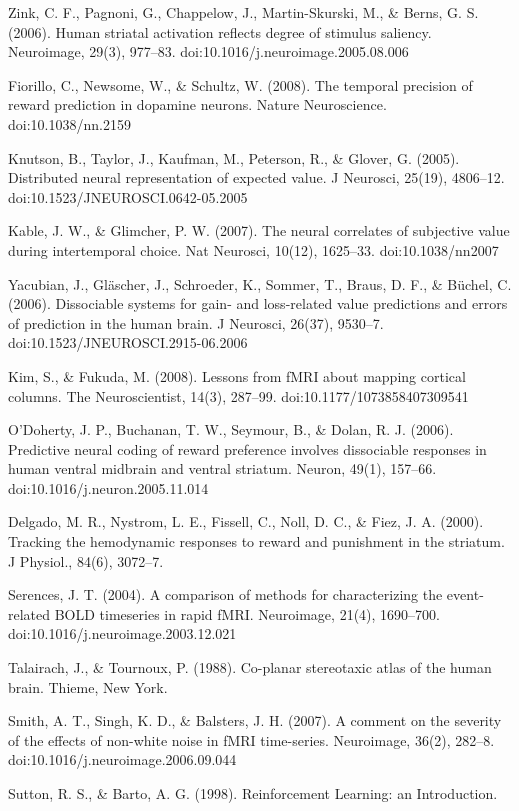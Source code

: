 Zink, C. F., Pagnoni, G., Chappelow, J., Martin-Skurski, M., & Berns, G. S. (2006). Human striatal activation reflects degree of stimulus saliency. Neuroimage, 29(3), 977–83. doi:10.1016/j.neuroimage.2005.08.006

Fiorillo, C., Newsome, W., & Schultz, W. (2008). The temporal precision of reward prediction in dopamine neurons. Nature Neuroscience. doi:10.1038/nn.2159

Knutson, B., Taylor, J., Kaufman, M., Peterson, R., & Glover, G. (2005). Distributed neural representation of expected value. J Neurosci, 25(19), 4806–12. doi:10.1523/JNEUROSCI.0642-05.2005

Kable, J. W., & Glimcher, P. W. (2007). The neural correlates of subjective value during intertemporal choice. Nat Neurosci, 10(12), 1625–33. doi:10.1038/nn2007

Yacubian, J., Gläscher, J., Schroeder, K., Sommer, T., Braus, D. F., & Büchel, C. (2006). Dissociable systems for gain- and loss-related value predictions and errors of prediction in the human brain. J Neurosci, 26(37), 9530–7. doi:10.1523/JNEUROSCI.2915-06.2006

Kim, S., & Fukuda, M. (2008). Lessons from fMRI about mapping cortical columns. The Neuroscientist, 14(3), 287–99. doi:10.1177/1073858407309541

O'Doherty, J. P., Buchanan, T. W., Seymour, B., & Dolan, R. J. (2006). Predictive neural coding of reward preference involves dissociable responses in human ventral midbrain and ventral striatum. Neuron, 49(1), 157–66. doi:10.1016/j.neuron.2005.11.014

Delgado, M. R., Nystrom, L. E., Fissell, C., Noll, D. C., & Fiez, J. A. (2000). Tracking the hemodynamic responses to reward and punishment in the striatum. J Physiol., 84(6), 3072–7.

Serences, J. T. (2004). A comparison of methods for characterizing the event-related BOLD timeseries in rapid fMRI. Neuroimage, 21(4), 1690–700. doi:10.1016/j.neuroimage.2003.12.021

Talairach, J., & Tournoux, P. (1988). Co-planar stereotaxic atlas of the human brain. Thieme, New York.

Smith, A. T., Singh, K. D., & Balsters, J. H. (2007). A comment on the severity of the effects of non-white noise in fMRI time-series. Neuroimage, 36(2), 282–8. doi:10.1016/j.neuroimage.2006.09.044

Sutton, R. S., & Barto, A. G. (1998). Reinforcement Learning: an Introduction.

